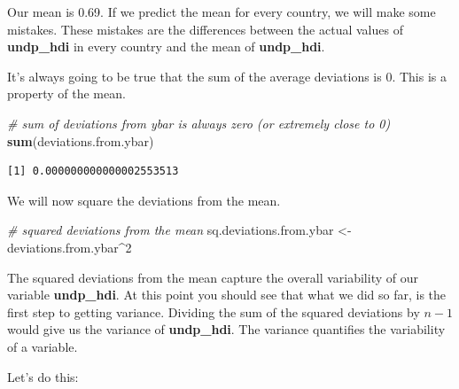 \documentclass[]{article}
\newenvironment{Shaded}{\begin{snugshade}}{\end{snugshade}}
\newcommand{\KeywordTok}[1]{\textcolor[rgb]{0.13,0.29,0.53}{\textbf{#1}}}
\newcommand{\DecValTok}[1]{\textcolor[rgb]{0.00,0.00,0.81}{#1}}
\newcommand{\StringTok}[1]{\textcolor[rgb]{0.31,0.60,0.02}{#1}}
\newcommand{\CommentTok}[1]{\textcolor[rgb]{0.56,0.35,0.01}{\textit{#1}}}
\newcommand{\OperatorTok}[1]{\textcolor[rgb]{0.81,0.36,0.00}{\textbf{#1}}}
\newcommand{\NormalTok}[1]{#1}
\theoremstyle{definition}
\theoremstyle{definition}
\theoremstyle{definition}
\theoremstyle{remark}
\begin{document}
Our mean is 0.69. If we predict the mean for every country, we will make
some mistakes. These mistakes are the differences between the actual
values of \textbf{undp\_hdi} in every country and the mean of
\textbf{undp\_hdi}.

\begin{Shaded}
\end{Shaded}

It's always going to be true that the sum of the average deviations is
0. This is a property of the mean.

\begin{Shaded}
\begin{Highlighting}[]
\CommentTok{# sum of deviations from ybar is always zero (or extremely close to 0)}
\KeywordTok{sum}\NormalTok{(deviations.from.ybar)}
\end{Highlighting}
\end{Shaded}

\begin{verbatim}
[1] 0.000000000000002553513
\end{verbatim}

We will now square the deviations from the mean.

\begin{Shaded}
\begin{Highlighting}[]
\CommentTok{# squared deviations from the mean}
\NormalTok{sq.deviations.from.ybar <-}\StringTok{ }\NormalTok{deviations.from.ybar}\OperatorTok{^}\DecValTok{2}
\end{Highlighting}
\end{Shaded}

The squared deviations from the mean capture the overall variability of
our variable \textbf{undp\_hdi}. At this point you should see that what
we did so far, is the first step to getting variance. Dividing the sum
of the squared deviations by \(n-1\) would give us the variance of
\textbf{undp\_hdi}. The variance quantifies the variability of a
variable.

Let's do this:

\begin{Shaded}
\end{Shaded}
\end{document}
